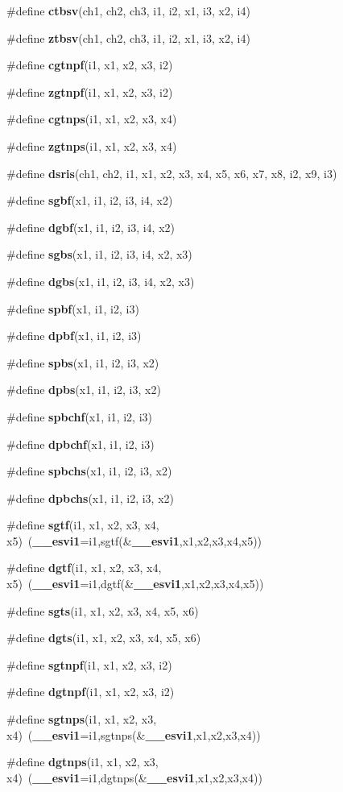 \begin{CompactItemize}
\#define {\bf ctbsv}(ch1, ch2, ch3, i1, i2, x1, i3, x2, i4)
\item 
\#define {\bf ztbsv}(ch1, ch2, ch3, i1, i2, x1, i3, x2, i4)
\item 
\#define {\bf cgtnpf}(i1, x1, x2, x3, i2)
\item 
\#define {\bf zgtnpf}(i1, x1, x2, x3, i2)
\item 
\#define {\bf cgtnps}(i1, x1, x2, x3, x4)
\item 
\#define {\bf zgtnps}(i1, x1, x2, x3, x4)
\item 
\#define {\bf dsris}(ch1, ch2, i1, x1, x2, x3, x4, x5, x6, x7, x8, i2, x9, i3)
\item 
\#define {\bf sgbf}(x1, i1, i2, i3, i4, x2)
\item 
\#define {\bf dgbf}(x1, i1, i2, i3, i4, x2)
\item 
\#define {\bf sgbs}(x1, i1, i2, i3, i4, x2, x3)
\item 
\#define {\bf dgbs}(x1, i1, i2, i3, i4, x2, x3)
\item 
\#define {\bf spbf}(x1, i1, i2, i3)
\item 
\#define {\bf dpbf}(x1, i1, i2, i3)
\item 
\#define {\bf spbs}(x1, i1, i2, i3, x2)
\item 
\#define {\bf dpbs}(x1, i1, i2, i3, x2)
\item 
\#define {\bf spbchf}(x1, i1, i2, i3)
\item 
\#define {\bf dpbchf}(x1, i1, i2, i3)
\item 
\#define {\bf spbchs}(x1, i1, i2, i3, x2)
\item 
\#define {\bf dpbchs}(x1, i1, i2, i3, x2)
\item 
\#define {\bf sgtf}(i1, x1, x2, x3, x4, x5)~({\bf \_\-\_\-esvi1}=i1,sgtf(\&{\bf \_\-\_\-esvi1},x1,x2,x3,x4,x5))
\item 
\#define {\bf dgtf}(i1, x1, x2, x3, x4, x5)~({\bf \_\-\_\-esvi1}=i1,dgtf(\&{\bf \_\-\_\-esvi1},x1,x2,x3,x4,x5))
\item 
\#define {\bf sgts}(i1, x1, x2, x3, x4, x5, x6)
\item 
\#define {\bf dgts}(i1, x1, x2, x3, x4, x5, x6)
\item 
\#define {\bf sgtnpf}(i1, x1, x2, x3, i2)
\item 
\#define {\bf dgtnpf}(i1, x1, x2, x3, i2)
\item 
\#define {\bf sgtnps}(i1, x1, x2, x3, x4)~({\bf \_\-\_\-esvi1}=i1,sgtnps(\&{\bf \_\-\_\-esvi1},x1,x2,x3,x4))
\item 
\#define {\bf dgtnps}(i1, x1, x2, x3, x4)~({\bf \_\-\_\-esvi1}=i1,dgtnps(\&{\bf \_\-\_\-esvi1},x1,x2,x3,x4))

\end{CompactItemize}
